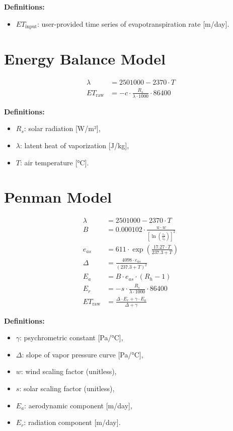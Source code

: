 \documentclass[12pt]{report}
\begin{document}
\textbf{Definitions:}
\begin{itemize}
  \item \( ET_{\text{input}} \): user-provided time series of evapotranspiration rate [m/day].
\end{itemize}

\section{Energy Balance Model}

\begin{align}
\lambda &= 2501000 - 2370 \cdot T \\
ET_{\text{raw}} &= -c \cdot \frac{R_s}{\lambda \cdot 1000} \cdot 86400
\end{align}

\textbf{Definitions:}
\begin{itemize}
  \item \( R_s \): solar radiation [W/m²],
  \item \( \lambda \): latent heat of vaporization [J/kg],
  \item \( T \): air temperature [°C].
\end{itemize}

\section{Penman Model}

\begin{align}
\lambda &= 2501000 - 2370 \cdot T \\
B &= 0.000102 \cdot \frac{u \cdot w}{\left[\ln\left(\frac{z_2}{z_0}\right)\right]^2} \\
e_{as} &= 611 \cdot \exp\left(\frac{17.27 \cdot T}{237.3 + T}\right) \\
\Delta &= \frac{4098 \cdot e_{as}}{(237.3 + T)^2} \\
E_a &= B \cdot e_{as} \cdot (R_h - 1) \\
E_r &= -s \cdot \frac{R_s}{\lambda \cdot 1000} \cdot 86400 \\
ET_{\text{raw}} &= \frac{\Delta \cdot E_r + \gamma \cdot E_a}{\Delta + \gamma}
\end{align}

\textbf{Definitions:}
\begin{itemize}
  \item \( \gamma \): psychrometric constant [Pa/°C],
  \item \( \Delta \): slope of vapor pressure curve [Pa/°C],
  \item \( w \): wind scaling factor (unitless),
  \item \( s \): solar scaling factor (unitless),
  \item \( E_a \): aerodynamic component [m/day],
  \item \( E_r \): radiation component [m/day].
\end{itemize}
\end{document}
